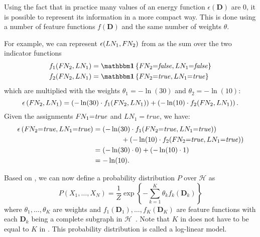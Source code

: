 \bigskip

Using the fact that in practice many values of an \gls{energy function} $\epsilon(\mathbf{D})$ are $0$, it is possible to represent its information in a more compact way.
This is done using a number of \glspl{feature function} $f(\mathbf{D})$ and the same number of weights $\theta$.

For example, we can represent $\epsilon(LN_1,F\hspace{-0.07em} N_2)$ from  as the sum over the two indicator functions
\begin{equation*}
  \begin{split}
    f_1(F\rs N_2,LN_1)&=\identityfun\left\{F\rs N_2{=}\mathit{false},LN_1{=}\mathit{false}\right\}\\
    f_2(F\rs N_2,LN_1)&=\identityfun\left\{F\rs N_2{=}\mathit{true},LN_1{=}\mathit{true}\right\}
  \end{split}
\end{equation*}
which are multiplied with the weights $\theta_1{=}-\ln(30)$ and $\theta_2{=}-\ln(10)$:
\begin{equation*}
  \epsilon\left(F\hspace{-0.07em} N_2,LN_1\right)=\left(-\ln(30)\cdot f_1(F\hspace{-0.07em} N_2,LN_1)\right)+\left(-\ln(10)\cdot f_2(F\hspace{-0.07em} N_2,LN_1)\right).
\end{equation*}
Given the \glspl{assignment} $F\hspace{-0.07em} N_1{=}\mathit{true}$ and $LN_1{=}\mathit{true}$, we have:
\begin{equation*}
  \begin{split}
  \epsilon\left(F\hspace{-0.07em} N_2{=}\mathit{true},LN_1{=}\mathit{true}\right)&=\left(-\ln(30)\cdot f_1(F\hspace{-0.07em} N_2{=}\mathit{true},LN_1{=}\mathit{true})\right)\\
  &\hspace{4em}+\left(-\ln(10)\cdot f_2(F\hspace{-0.07em} N_2{=}\mathit{true},LN_1{=}\mathit{true})\right)\\
  &=\left(-\ln(30)\cdot 0\right)+\left(-\ln(10)\cdot 1\right)\\
  &=-\ln(10).
  \end{split}
\end{equation*}

\bigskip

Based on , we can now define a \gls{probability distribution} $P$ over $\mathcal{H}$ as
\begin{equation}
  \label{equ:log-linear-model}
  P\left(X_1,\dots,X_N\right) = \frac{1}{Z}\exp\left\{-\sum_{k=1}^K \theta_k f_k\left(\mathbf{D}_k\right)\right\}
\end{equation}
where $\theta_1,\dots,\theta_K$ are weights and $f_1(\mathbf{D}_1),\dots,f_K(\mathbf{D}_K)$ are \glspl{feature function} with each $\mathbf{D}_k$ being a complete subgraph in $\mathcal{H}$~\citep{koller2009probabilistic}.
Note that $K$ in  does not have to be equal to $K$ in .
This \gls{probability distribution} is called a \gls{log-linear model}.

